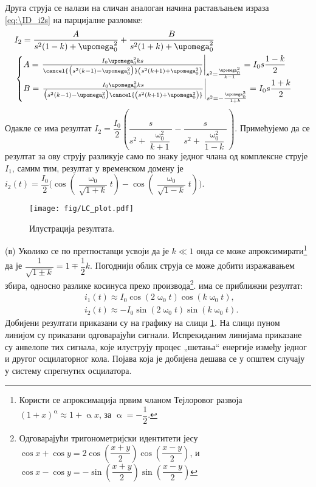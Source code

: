 Друга струја се налази на сличан аналоган начина растављањем израза 
\eqref{eq:\ID_i2s} на парцијалне разломке: 
\begin{eqnarray}
    &I_2 = \dfrac{A}{s^2(1 - k) + \upomega_0^2} + \dfrac{B}{s^2(1+k) + \upomega_0^2} \\ 
    &
    \begin{cases}
    A = 
    \left.
    \frac{I_{0} \upomega_{0}^{2} k s}
    { \cancel{\bigl(s^{2} \left(k - 1\right) - \upomega_{0}^{2} \bigr)} \left(s^{2} \left(k + 1\right) + \upomega_{0}^{2}\right)}
    \right\rvert_{s^2 = \frac{\upomega_0^2}{k-1}}
    = I_0 s \dfrac{1-k}{2} 
        \\    
    B = \left.
        \frac{I_{0} \upomega_{0}^{2} k s}
        { \bigl(s^{2} \left(k - 1\right) - \upomega_{0}^{2} \bigr) \cancel{\left(s^{2} \left(k + 1\right) + \upomega_{0}^{2}\right)}}
    \right\rvert_{s^2 = -\frac{\upomega_0^2}{1 + k}}
    = I_0 s \dfrac{1+k}{2}
    \end{cases}
\end{eqnarray}
   Одакле се има резултат 
    $I_2 = 
\dfrac{I_0}{2} \left(  
    \dfrac{s}{s^2 + \dfrac{\upomega_0^2}{k+1} }
    -
    \dfrac{s}{s^2 + \dfrac{\upomega_0^2}{1-k}}
\right)$. Примећујемо да се резултат за ову струју разликује само по знаку једног члана од 
комплексне струје $I_1$, самим тим, резултат у временском домену је 
$i_2(t) = \dfrac{I_0}{2} 
\Biggl(
    \cos \left( \dfrac{\upomega_0}{\sqrt{1+k}}t\right) - \cos\left(\dfrac{\upomega_0}{\sqrt{1-k}}t\right) 
\Biggr)$. 

\begin{figure}[t!]
    \texttt{[image: fig/LC\_plot.pdf]}
    \caption{Илустрација резултата.}
    \label{fig:\ID.2}
\end{figure}

(в) Уколико се по претпоставци усвоји да је $k\ll1$ онда се може 
апроксимирати\footnote{Користи се апроксимација првим чланом Тејлоровог развоја
$(1 + x)^{\upalpha} \approx 1 + \upalpha x$, за $\upalpha = -\dfrac{1}{2}$.}
да је $\dfrac{1}{\sqrt{1 \pm k}} = 1 \mp \dfrac{1}{2}k$. Погоднији облик струја се може добити 
изражавањем збира, односно разлике косинуса преко производа\footnote{ Одговарајући тригонометријски идентитети јесу
$\cos x + \cos y = 2 \cos\left(\dfrac{x+y}{2}\right)\cos\left(\dfrac{x-y}{2}\right)$, 
и $\cos x - \cos y = - \sin\left(\dfrac{x+y}{2}\right)\sin\left(\dfrac{x-y}{2}\right)$}. има се приближни
резултат:
\begin{eqnarray}
    & i_1(t) \approx I_0 \cos(2\upomega_0 t) \cos( k\upomega_0 t ), \\
    & i_2(t) \approx -I_0 \sin(2\upomega_0 t) \sin( k\upomega_0 t ).
\end{eqnarray}
Добијени резултати приказани су на графику на слици \ref{fig:\ID.2}. На слици пуном линијом 
су приказани одговарајући сигнали. Испрекиданим линијама приказане су анвелопе тих сигнала, 
које илуструју процес „шетања“ енергије између једног и другог осцилаторног кола. 
Појава која је добијена дешава се у општем случају у систему спрегнутих осцилатора. 


